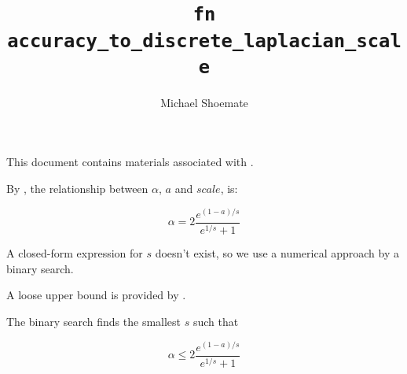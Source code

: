 \documentclass{article}
\title{\texttt{fn accuracy\_to\_discrete\_laplacian\_scale}}
\author{Michael Shoemate}
\begin{document}
\maketitle

This document contains materials associated with .

By , 
the relationship between $\alpha$, $a$ and $scale$, is:

\begin{equation*}
    \alpha = 2 \frac{e^{(1 - a)/s}}{e^{1/s} + 1}
\end{equation*}

A closed-form expression for $s$ doesn't exist, 
so we use a numerical approach by a binary search.

A loose upper bound is provided by .

The binary search finds the smallest $s$ such that

\begin{equation*}
    \alpha \le 2 \frac{e^{(1 - a)/s}}{e^{1/s} + 1}
\end{equation*}
\end{document}
